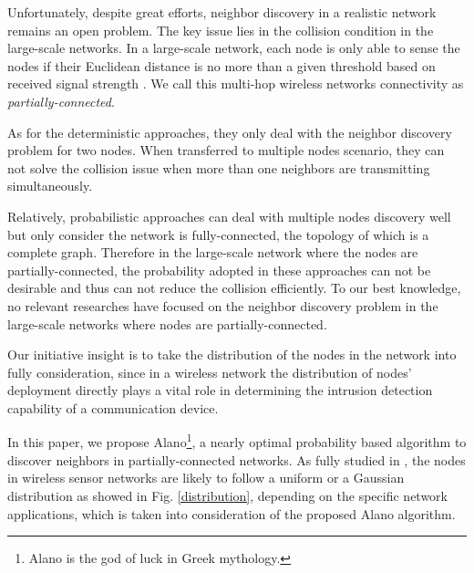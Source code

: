 Unfortunately, despite great efforts, neighbor discovery in a realistic network remains an open problem.
The key issue lies in the collision condition in the large-scale networks.
In a large-scale network, each node is only able to sense the 
nodes if their Euclidean distance is no more than a given threshold 
based on received signal strength \cite{moscibroda2006complexity, wang2013gaussian, wang2015connectivity}.  
We call this multi-hop wireless networks connectivity as \emph{partially-connected}.


As for the deterministic approaches, they only deal with the neighbor discovery problem for two nodes.
When transferred to multiple nodes scenario, they can not solve the collision issue when more 
than one neighbors are transmitting simultaneously. 


Relatively, probabilistic approaches can deal with multiple nodes discovery well but only consider
the network is fully-connected, the topology of which is a complete graph. 
Therefore in the large-scale network where the nodes are partially-connected,  
the probability adopted in these approaches can not be desirable 
and thus can not reduce the collision efficiently. 
To our best knowledge, no relevant researches 
have focused on the neighbor discovery problem in the large-scale networks 
where nodes are partially-connected.


Our initiative insight is to take the distribution of the nodes in the network
into fully consideration, since in a wireless network the distribution of 
nodes' deployment directly plays a vital role in determining the intrusion 
detection capability of a communication device.

In this paper, we propose Alano\footnote{Alano is the god of luck in Greek mythology.}, 
a nearly optimal probability based algorithm to discover neighbors in partially-connected networks. 
As fully studied in \cite{wang2013gaussian} , the nodes in wireless sensor networks are likely to 
follow a uniform or a Gaussian distribution as showed in Fig. \ref{distribution}, 
depending on the specific network applications, which is taken into consideration of the proposed Alano algorithm.

